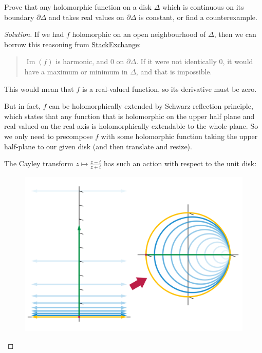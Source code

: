 \documentclass{article}
\numberwithin{equation}{section}
\renewcommand{\Im}{\operatorname{Im}}
\begin{document}
\begin{exercise}
	Prove that any holomorphic function on a disk $\Delta$ which is continuous on its boundary $\partial\Delta$ and takes real values on $\partial\Delta$ is constant, or find a counterexample.
\end{exercise}
\begin{proof}[Solution]
	If we had $f$ holomorphic on an open neighbourhood of $\Delta$, then we can borrow this reasoning from \href{https://math.stackexchange.com/questions/3482976/holomorphic-function-with-real-values-on-boundary}{StackExchange}:
	\begin{quote}
		$\Im(f)$ is harmonic, and 0 on $\partial\Delta$. If it were not identically 0, it would have a maximum or minimum in $\Delta$, and that is impossible.
	\end{quote}
	This would mean that $f$ is a real-valued function, so its derivative must be zero.
	
	But in fact, $f$ can be holomorphically extended by Schwarz reflection principle, which states that any function that is holomorphic on the upper half plane and real-valued on the real axis is holomorphically extendable to the whole plane. So we only need to precompose $f$ with some holomorphic function taking the upper half-plane to our given disk (and then translate and resize).
	
	The Cayley transform $z\mapsto \frac{z-i}{z+i}$ has such an action with respect to the unit disk:
	
	\begin{figure}[H]
		\centering
		\includegraphics[width=0.7\linewidth]{fig1}
		\label{fig:fig1}
	\end{figure}	
\end{proof}
\end{document}
